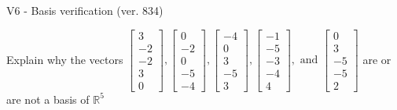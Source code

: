 \begin{exercise}
  \begin{exerciseTitle}V6 - Basis verification (ver. 834)\end{exerciseTitle}
  \begin{exerciseStatement}
    Explain why the vectors \(\left[\begin{array}{r}
3 \\
-2 \\
-2 \\
3 \\
0
\end{array}\right] , \left[\begin{array}{r}
0 \\
-2 \\
0 \\
-5 \\
-4
\end{array}\right] , \left[\begin{array}{r}
-4 \\
0 \\
3 \\
-5 \\
3
\end{array}\right] , \left[\begin{array}{r}
-1 \\
-5 \\
-3 \\
-4 \\
4
\end{array}\right] , \text{ and } \left[\begin{array}{r}
0 \\
3 \\
-5 \\
-5 \\
2
\end{array}\right]\) are or are not a basis of \(\mathbb{R}^5\)	



\end{exerciseStatement}
\end{exercise}
